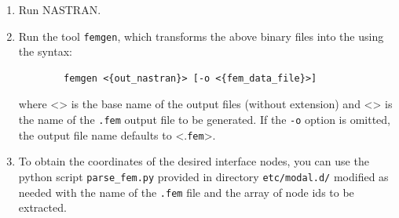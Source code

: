 \begin{enumerate}
\begin{enumerate}
		\emph{Note: this works; see} \texttt{tests/joints/modal/beam.README} and 
		\texttt{tests/joints/modal/goland-wing}.

	\item \texttt{MBDyn\_NASTRAN\_alter\_SOL106\_2024.nas} contains
		 definitions for a non-linear static analysis followed by an 
		eigenanalysis solutions (SOL106);

		\emph{Note: this works; see} \texttt{tests/joints/modal/shell-blade}

	\end{enumerate}

	Exactly one of these files must be included at the very top 
	of the NASTRAN input file. 
	They already include the appropriate  statement, so the
	input file must begin with: 
	\begin{verbatim}
		$ Replace '#' below with number that matches your needs
		INCLUDE 'MBDyn_NASTRAN_alter_#.nas'
		CEND
		$... any other executive control and bulk data card
	\end{verbatim}

	Both  and  produce one binary file  which
	contains the modal mass and stiffness matrices and the lumped nodal masses.  
	The deformed configuration and the mode shapes are written in the \texttt{.op2} file. 
\item Run NASTRAN.

\item Run the tool \texttt{femgen}, which transforms the above binary files
	into the  using the syntax: 
	\begin{verbatim}
		femgen <{out_nastran}> [-o <{fem_data_file}>]   	
	\end{verbatim}
	where <> is the base name of the output files (without extension) 
	and <> is the name of the \texttt{.fem} output file to be generated.
	If the \texttt{-o} option is omitted, the output file name defaults to
	<.\texttt{fem}>. 

\item To obtain the coordinates of the desired interface nodes, you can use the python script
	\texttt{parse_fem.py} provided in directory \texttt{etc/modal.d/} modified as needed with the 
	name of the \texttt{.fem} file and the array of node ids to be extracted. 

\end{enumerate} %


